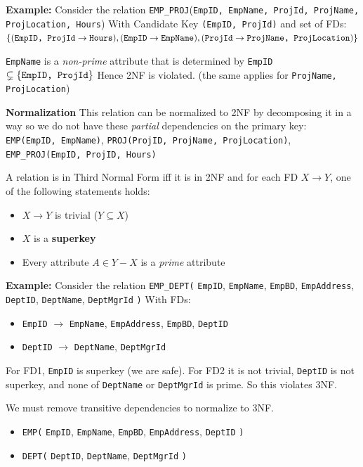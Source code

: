 \documentclass{article}
\begin{document}
\textbf{Example: }Consider the relation \texttt{EMP\_PROJ}(\texttt{EmpID, EmpName, ProjId, ProjName, ProjLocation, Hours}) With Candidate Key \texttt{(EmpID, ProjId)} and set of FDs:\\
$\{
    (\texttt{EmpID, ProjId} \to \texttt{Hours}),\\
    (\texttt{EmpID} \to \texttt{EmpName}),\\
    (\texttt{ProjId} \to \texttt{ProjName, ProjLocation})
\}$

\texttt{EmpName} is a \textit{non-prime} attribute that is determined by \texttt{EmpID} $\subsetneq \{\texttt{EmpID, ProjId}\}$ Hence 2NF is violated. (the same applies for \texttt{ProjName, ProjLocation})

\textbf{Normalization}
This relation can be normalized to 2NF by decomposing it in a way so we do not have these \textit{partial} dependencies on the primary key:
\texttt{EMP(EmpID, EmpName)}, \texttt{PROJ(ProjID, ProjName, ProjLocation)}, \texttt{EMP\_PROJ(EmpID, ProjID, Hours)}

A relation is in Third Normal Form iff it is in 2NF and for each FD $X \to Y$, one of the following statements holds:
\begin{itemize}
    \item $X \to Y$ is trivial ($Y \subseteq X$)
    \item $X$ is a \textbf{superkey}
    \item Every attribute $A \in Y - X$ is a \textit{prime} attribute
\end{itemize}

\textbf{Example: }Consider the relation \texttt{EMP\_DEPT(}%
\texttt{EmpID}, %
\texttt{EmpName}, %
\texttt{EmpBD}, %
\texttt{EmpAddress}, %
\texttt{DeptID}, %
\texttt{DeptName}, %
\texttt{DeptMgrId}%
\texttt{)}
With FDs:
\begin{itemize}
    \item \texttt{EmpID} $\to$ \texttt{EmpName}, \texttt{EmpAddress}, \texttt{EmpBD}, \texttt{DeptID}
    \item \texttt{DeptID} $\to$ \texttt{DeptName}, \texttt{DeptMgrId}
\end{itemize}

For FD1, \texttt{EmpID} is superkey (we are safe). For FD2 it is not trivial, \texttt{DeptID} is not superkey, and none of \texttt{DeptName} or \texttt{DeptMgrId} is prime. So this violates 3NF.

We must remove transitive dependencies to normalize to 3NF.
\begin{itemize}
    \item \texttt{EMP(}%
\texttt{EmpID}, %
\texttt{EmpName}, %
\texttt{EmpBD}, %
\texttt{EmpAddress}, %
\texttt{DeptID}
\texttt{)}
    \item \texttt{DEPT(}%
\texttt{DeptID}, %
\texttt{DeptName}, %
\texttt{DeptMgrId}%
\texttt{)}
\end{itemize}
\end{document}
